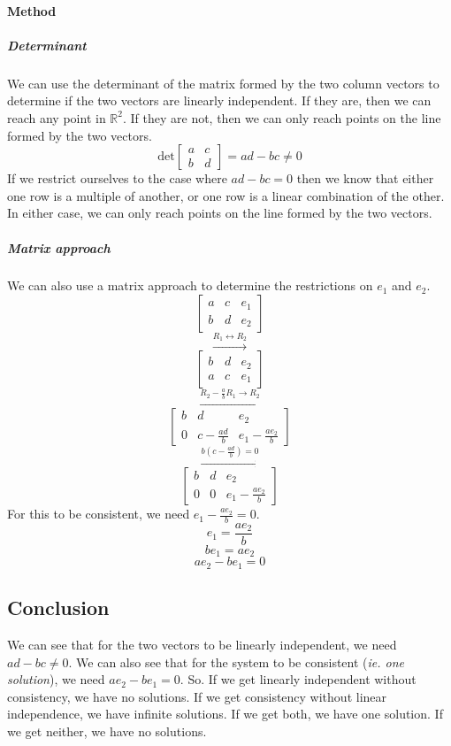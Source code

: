 \documentclass{article}
\begin{document}
        \paragraph{Method}
            \subparagraph{Determinant}
            We can use the determinant of the matrix formed by the two column vectors to determine
            if the two vectors are linearly independent. If they are, then we can reach any
            point in $\mathbb{R}^2$. If they are not, then we can only reach points on the line
            formed by the two vectors.
            \[
            \text{det}\begin{bmatrix}a & c \\ b & d\end{bmatrix} = ad - bc \neq 0
            \]
            If we restrict ourselves to the case where $ad - bc = 0$ then we know that either one row is a multiple of
            another, or one row is a linear combination of the other. In either case, we can only reach
            points on the line formed by the two vectors.
            \subparagraph{Matrix approach}
            We can also use a matrix approach to determine the restrictions on $e_1$ and $e_2$.
            \[\left[\begin{array}{cc|c}
            a & c & e_1 \\
            b & d & e_2
            \end{array}\right]\]
            \[\xrightarrow{R_1 \leftrightarrow R_2}\]
            \[\left[\begin{array}{cc|c}
            b & d & e_2 \\
            a & c & e_1
            \end{array}\right]\]
            \[\xrightarrow{R_2 - \frac{a}{b}R_1 \rightarrow R_2}\]
            \[\left[\begin{array}{cc|c}
            b & d & e_2 \\
            0 & c - \frac{ad}{b} & e_1 - \frac{ae_2}{b}
            \end{array}\right]\]
            \[\xrightarrow{b(c - \frac{ad}{b}) = 0}\]
            \[\left[\begin{array}{cc|c}
            b & d & e_2 \\
            0 & 0 & e_1 - \frac{ae_2}{b}
            \end{array}\right]\]
            For this to be consistent, we need $e_1 - \frac{ae_2}{b} = 0$.
            \[e_1 = \frac{ae_2}{b}\]
            \[be_1 = ae_2\]
            \[ae_2 - be_1 = 0\]
    \subsection{Conclusion}
        We can see that for the two vectors to be linearly independent, we need \\ $ad - bc \neq 0$.
        We can also see that for the system to be consistent (\emph{ie. one solution}), we need $ae_2 - be_1 = 0$.
        So. If we get linearly independent without consistency, we have no solutions. If we get consistency without
        linear independence, we have infinite solutions. If we get both, we have one solution. If we get neither, we have no solutions.
        \cite{ConsistentIndependent}
\end{document}
